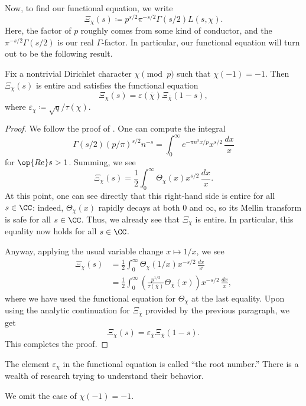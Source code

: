 \documentclass[../notes.tex]{subfiles}
\begin{document}
Now, to find our functional equation, we write
\[\Xi_\chi(s)\coloneqq p^{s/2}\pi^{-s/2}\Gamma(s/2)L(s,\chi).\]
Here, the factor of $p$ roughly comes from some kind of conductor, and the $\pi^{-s/2}\Gamma(s/2)$ is our real $\Gamma$-factor. In particular, our functional equation will turn out to be the following result.
\begin{theorem}
	Fix a nontrivial Dirichlet character $\chi\pmod p$ such that $\chi(-1)=-1$. Then $\Xi_\chi(s)$ is entire and satisfies the functional equation
	\[\Xi_\chi(s)=\varepsilon(\overline\chi)\Xi_{\overline\chi}(1-s),\]
	where $\varepsilon_\chi\coloneqq\sqrt q/\tau(\chi)$.
\end{theorem}
\begin{proof}
	We follow the proof of . One can compute the integral
	\[\Gamma(s/2)(p/\pi)^{s/2}n^{-s}=\int_0^\infty e^{-\pi n^2x/p}x^{s/2}\,\frac{dx}x\]
	for $\op{Re}s>1$. Summing, we see
	\[\Xi_\chi(s)=\frac12\int_0^\infty\Theta_\chi(x)x^{s/2}\,\frac{dx}x.\]
	At this point, one can see directly that this right-hand side is entire for all $s\in\CC$: indeed, $\Theta_\chi(x)$ rapidly decays at both $0$ and $\infty$, so its Mellin transform is safe for all $s\in\CC$. Thus, we already see that $\Xi_\chi$ is entire. In particular, this equality now holds for all $s\in\CC$.

	Anyway, applying the usual variable change $x\mapsto1/x$, we see
	\begin{align*}
		\Xi_\chi(s) &= \frac12\int_0^\infty\Theta_\chi(1/x)x^{-s/2}\,\frac{dx}x \\
		&= \frac12\int_0^\infty\left(\frac{p^{1/2}}{\tau(\overline\chi)}\Theta_{\overline\chi}(x)\right)x^{-s/2}\,\frac{dx}x,
	\end{align*}
	where we have used the functional equation for $\Theta_\chi$ at the last equality. Upon using the analytic continuation for $\Xi_{\overline\chi}$ provided by the previous paragraph, we get
	\[\Xi_\chi(s)=\varepsilon_{\overline\chi}\Xi_{\overline\chi}(1-s).\]
	This completes the proof.
\end{proof}
\begin{remark}
	The element $\varepsilon_\chi$ in the functional equation is called ``the root number.'' There is a wealth of research trying to understand their behavior.
\end{remark}
\begin{remark}
	We omit the case of $\chi(-1)=-1$.
\end{remark}
\end{document}
